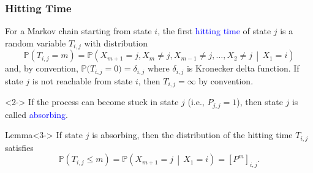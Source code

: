 \documentclass[10pt,english,aspectratio=169,handout]{beamer}
\renewcommand{\Pr}{\mathbb{P}}
\begin{document}
\begin{frame} \frametitle{Hitting Time}

\begin{definition}For a Markov chain starting from state $i$, the first \textcolor{blue}{hitting time} of state $j$ is a random variable $T_{i,j}$ with distribution \vspace{-2mm}
\[
\Pr\left(T_{i,j}=m\right)=\Pr\left(X_{m+1}=j,X_{m}\neq j,X_{m-1}\neq j,\ldots,X_{2}\neq j\,\middle|\,X_{1}=i\right)
\]
and, by convention, $\Pr\big(T_{i,j}=0\big)=\delta_{i,j}$ where $\delta_{i,j}$ is Kronecker delta function. If state $j$ is not reachable from state $i$, then $T_{i,j} = \infty$ by convention.
\end{definition}

\begin{definition}<2->
If the process can become stuck in state $j$ (i.e., $P_{j,j} = 1$), then state $j$ is called \textcolor{blue}{absorbing}.
\end{definition}

\begin{exampleblock}{Lemma}<3->
If state $j$ is absorbing, then the distribution of the hitting time $T_{i,j}$ satisfies \vspace{-2mm}
\[
\Pr\left(T_{i,j}\leq m\right)=\Pr\left(X_{m+1}=j\,\middle|\,X_{1}=i\right)=\left[P^{m}\right]_{i,j}.
\]
\end{exampleblock}

\end{frame}
\end{document}
